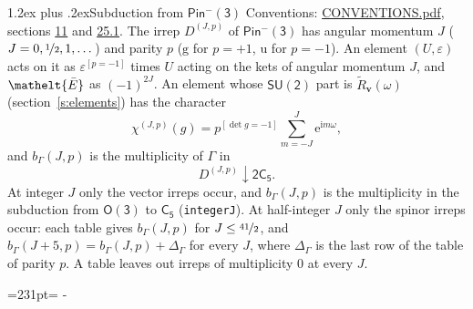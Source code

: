 \documentclass[10pt,a4paper]{article}
\makeatletter
\renewcommand\section{\@startsection{section}{1}{\z@}{-3ex plus -1ex minus -.2ex}%
  {1.2ex plus .2ex}{\normalfont\large\sffamily\bfseries\color{parttitle}}}
\newcommand{\needspace}[1]{\par\penalty-100\begingroup\dimen0=#1\relax\dimen2=\pagegoal
  \advance\dimen2-\pagetotal\ifdim\dimen0>\dimen2\relax\ifdim\dimen2>0pt\vfil\break\fi\fi
  \endgroup}
\numberwithin{equation}{section}
\newcommand{\eltfont}[1]{{\let\sigma\eltsigma\mathelt{#1}}}
\newcommand{\grp}[1]{\mathsf{#1}}
\newcommand{\elt}[1]{\eltfont{#1}}
\newcommand{\ptag}[1]{\mathrm{#1}}
\newcommand{\iverson}[1]{[#1]}
\newcommand{\restr}[2]{#1\!\downarrow#2}
\newcommand{\vv}{\mathbf{v}}
\newcommand{\iunit}{\mathrm{i}}
\newcommand{\expe}{\mathrm{e}}
\newcommand{\irrJp}[2]{D^{(#1,#2)}}
\newcommand{\barred}[1]{\bar{#1}}
\newcommand{\lift}[1]{\tilde{#1}}
\makeatother
\begin{document}
\section{Subduction from \texorpdfstring{$\grp{Pin^{-}(3)}$}{Pin(3)}}\label{s:subduction_parent}
Conventions: \href{../../CONVENTIONS.pdf}{CONVENTIONS.pdf}, sections \href{../../../rotation/CONVENTIONS.pdf\#conv.11}{11} and \href{../../CONVENTIONS.pdf\#conv.25.1}{25.1}.
\leavevmode\label{n:index.J}\label{n:index.parity}\label{n:irrep.o3}The irrep $\irrJp{J}{p}$ of \href{Pinminus3.pdf}{$\grp{Pin^{-}(3)}$} has angular momentum $J$ ($J = 0, \nicefrac{1}{2}, 1, \dots$) and parity $p$ ($\ptag{g}$ for $p = +1$, $\ptag{u}$ for $p = -1$). An element $(U, \varepsilon)$ acts on it as $\varepsilon^{[p = -1]}$ times $U$ acting on the kets of angular momentum $J$, and $\elt{\barred{E}}$ as $(-1)^{2J}$. \label{n:function.character.parent}\label{n:function.multiplicity}An element whose $\grp{SU(2)}$ part is $\lift{R}_{\vv}(\omega)$ (section~\ref{s:elements}) has the character
\begin{equation}\label{e:chi}\chi^{(J,p)}(g) = p^{\iverson{\det g = -1}}\sum_{m=-J}^{J} \expe^{\iunit m\omega},\end{equation}
and $b_\Gamma(J, p)$ is the multiplicity of $\Gamma$ in
\begin{equation}\label{e:parent}\restr{\irrJp{J}{p}}{\grp{2C_{5}}}.\end{equation}
At integer $J$ only the vector irreps occur, and $b_\Gamma(J, p)$ is the multiplicity in the subduction from $\grp{O(3)}$ to \href{../../../rotation/data/pdf/C5.pdf}{$\grp{C_{5}}$} (\texttt{integerJ}). \label{n:index.increment}At half-integer $J$ only the spinor irreps occur: each table gives $b_\Gamma(J, p)$ for $J \le \nicefrac{41}{2}$, and $b_\Gamma(J + 5, p) = b_\Gamma(J, p) + \Delta_\Gamma$ for every $J$, where $\Delta_\Gamma$ is the last row of the table of parity $p$. A table leaves out irreps of multiplicity 0 at every $J$.
\needspace{231pt}
\end{document}
